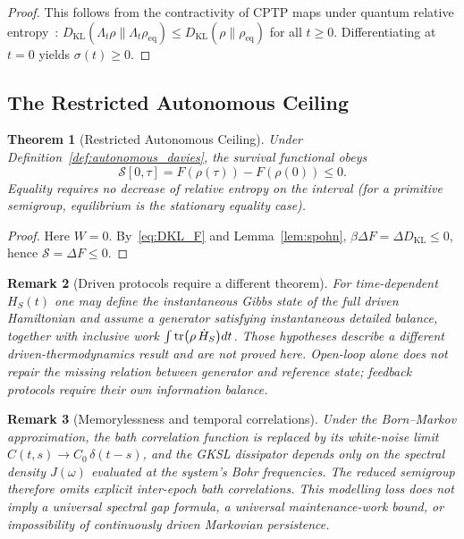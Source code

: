 \documentclass[12pt]{article}
\newtheorem{theorem}{Theorem}
\newtheorem{remark}[theorem]{Remark}
\begin{document}
\begin{proof}
This follows from the contractivity of CPTP maps under quantum
relative entropy~\cite{Spohn1978,BreuerPetruccione2002}:
$D_{\mathrm{KL}}(\Lambda_t\rho \| \Lambda_t\rho_{\mathrm{eq}})
\leq D_{\mathrm{KL}}(\rho \| \rho_{\mathrm{eq}})$
for all $t \geq 0$.
Differentiating at $t = 0$ yields $\sigma(t) \geq 0$.
\end{proof}

\subsection{The Restricted Autonomous Ceiling}

\begin{theorem}[Restricted Autonomous Ceiling]
\label{thm:autonomous_ceiling}
Under Definition~\ref{def:autonomous_davies}, the survival functional
obeys
\begin{equation}
\label{eq:ceiling}
\mathcal S[0,\tau]=F(\rho(\tau))-F(\rho(0))\leq0.
\end{equation}
Equality requires no decrease of relative entropy on the interval
(for a primitive semigroup, equilibrium is the stationary equality case).
\end{theorem}

\begin{proof}
Here $W=0$.  By~\eqref{eq:DKL_F} and Lemma~\ref{lem:spohn},
$\beta\Delta F=\Delta D_{\mathrm{KL}}\leq0$, hence
$\mathcal S=\Delta F\leq0$.
\end{proof}

\begin{remark}[Driven protocols require a different theorem]
\label{rem:driven_protocol}
For time-dependent $H_S(t)$ one may define the instantaneous Gibbs
state of the full driven Hamiltonian and assume a generator satisfying
instantaneous detailed balance, together with inclusive work
$\int\tr(\rho\,\dot H_S)dt$.  Those hypotheses describe a different
driven-thermodynamics result and are not proved here.  Open-loop alone
does not repair the missing relation between generator and reference
state; feedback protocols require their own information balance.
\end{remark}

\begin{remark}[Memorylessness and temporal correlations]
\label{rem:temporal_blindness}
Under the Born--Markov approximation, the bath correlation
function is replaced by its white-noise limit
$C(t,s) \to C_0\,\delta(t-s)$, and the GKSL dissipator depends
only on the spectral density $J(\omega)$ evaluated at the
system's Bohr frequencies.
The reduced semigroup therefore omits explicit inter-epoch bath
correlations.  This modelling loss does not imply a universal spectral
gap formula, a universal maintenance-work bound, or impossibility of
continuously driven Markovian persistence.
\end{remark}
\end{document}
